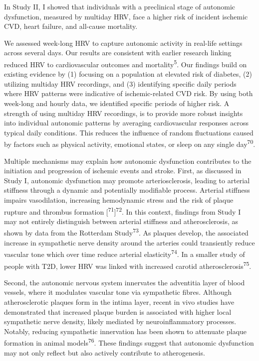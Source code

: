 \documentclass[
  a4paper,
  headsepline=true,
  open=any]{scrbook}
\begin{document}
In Study II, I showed that individuals with a preclinical stage of
autonomic dysfunction, measured by multiday HRV, face a higher risk of
incident ischemic CVD, heart failure, and all-cause mortality.

We assessed week-long HRV to capture autonomic activity in real-life
settings across several days. Our results are consistent with earlier
research linking reduced HRV to cardiovascular outcomes and
mortality\textsuperscript{5}. Our findings build on existing evidence by
(1) focusing on a population at elevated risk of diabetes, (2) utilizing
multiday HRV recordings, and (3) identifying specific daily periods
where HRV patterns were indicative of ischemic-related CVD risk. By
using both week-long and hourly data, we identified specific periods of
higher risk. A strength of using multiday HRV recordings, is to provide
more robust insights into individual autonomic patterns by averaging
cardiovascular responses across typical daily conditions. This reduces
the influence of random fluctuations caused by factors such as physical
activity, emotional states, or sleep on any single
day\textsuperscript{70}.

Multiple mechanisms may explain how autonomic dysfunction contributes to
the initiation and progression of ischemic events and stroke. First, as
discussed in Study I, autonomic dysfunction may promote
arteriosclerosis, leading to arterial stiffness through a dynamic and
potentially modifiable process. Arterial stiffness impairs vasodilation,
increasing hemodynamic stress and the risk of plaque rupture and
thrombus formation {[}\textsuperscript{71}{]}\textsuperscript{72}. In
this context, findings from Study I may not entirely distinguish between
arterial stiffness and atherosclerosis, as shown by data from the
Rotterdam Study\textsuperscript{73}. As plaques develop, the associated
increase in sympathetic nerve density around the arteries could
transiently reduce vascular tone which over time reduce arterial
elasticity\textsuperscript{74}. In a smaller study of people with T2D,
lower HRV was linked with increased carotid
atherosclerosis\textsuperscript{75}.

Second, the autonomic nervous system innervates the adventitia layer of
blood vessels, where it modulates vascular tone via sympathetic fibres.
Although atherosclerotic plaques form in the intima layer, recent in
vivo studies have demonstrated that increased plaque burden is
associated with higher local sympathetic nerve density, likely mediated
by neuroinflammatory processes. Notably, reducing sympathetic
innervation has been shown to attenuate plaque formation in animal
models\textsuperscript{76}. These findings suggest that autonomic
dysfunction may not only reflect but also actively contribute to
atherogenesis.
\end{document}
